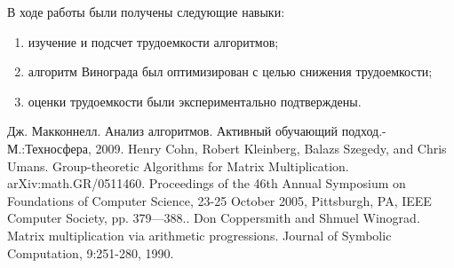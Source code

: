 \documentclass[a4paper, 14pt]{article}
\begin{document}
	В ходе работы были получены следующие навыки:
\begin{enumerate}
	\item изучение и подсчет трудоемкости алгоритмов;
	\item алгоритм Винограда был оптимизирован с целью снижения трудоемкости;
	\item оценки трудоемкости были экспериментально подтверждены.
\end{enumerate}

\newpage
{}

\begin{thebibliography}{}
      Дж. Макконнелл. Анализ алгоритмов. Активный обучающий подход.-М.:Техносфера, 2009.
     Henry Cohn, Robert Kleinberg, Balazs Szegedy, and Chris Umans. Group-theoretic Algorithms for Matrix Multiplication. arXiv:math.GR/0511460. Proceedings of the 46th Annual Symposium on Foundations of Computer Science, 23-25 October 2005, Pittsburgh, PA, IEEE Computer Society, pp. 379—388.. 
     Don Coppersmith and Shmuel Winograd. Matrix multiplication via arithmetic progressions. Journal of Symbolic Computation, 9:251-280, 1990.
\end{thebibliography}
	
	\newpage
	
	
	
\end{document}
